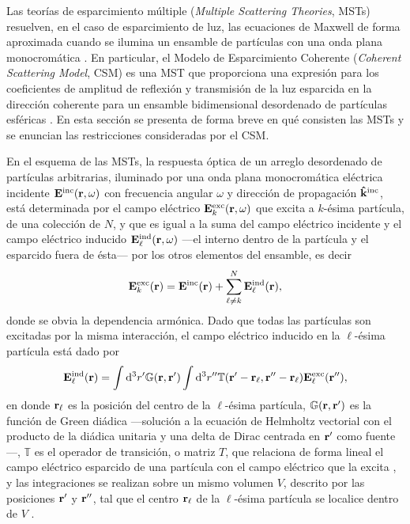 %
Las teorías de esparcimiento múltiple (\textit{Multiple Scattering Theories}, MSTs) resuelven, en el caso de esparcimiento de luz, las ecuaciones de Maxwell de forma aproximada cuando se ilumina un ensamble de partículas con una onda plana monocromática \cite{loiko_monolayers_1998,barrera1991optical,reyes2018analytical}. En particular, el  Modelo de Esparcimiento Coherente (\textit{Coherent Scattering Model}, CSM)  es una MST que proporciona una expresión para los coeficientes de amplitud de reflexión y transmisión de la luz esparcida en la dirección coherente para un ensamble bidimensional desordenado de partículas esféricas \cite{barrera_coherent_2003,garcia2012multiple,reyes2018analytical}. En esta sección se presenta de forma breve en qué consisten las MSTs y se enuncian las restricciones consideradas por el CSM.

En el esquema de las MSTs, la respuesta óptica de un arreglo desordenado de partículas arbitrarias, iluminado por una onda plana monocromática eléctrica incidente $\vb{E}^\text{inc}(\vb{r},\omega)$ con frecuencia angular $\omega$ y dirección de propagación $\vu{k}^\text{inc}$, está determinada por el campo eléctrico $\vb{E}^\text{exc}_k(\vb{r},\omega)$ que excita a $k$-ésima partícula, de una colección de $N$, y que es igual a la suma del campo eléctrico incidente y el campo eléctrico inducido $\vb{E}^\text{ind}_\ell(\vb{r},\omega)$ ---el interno dentro de la partícula y el esparcido fuera de ésta--- por los otros elementos del ensamble, es decir \cite{garcia2012multiple,barrera_coherent_2003}
%
\begin{align}
	\vb{E}^\text{exc}_k(\vb{r}) = \vb{E}^\text{inc}(\vb{r}) + \sum_{\ell\neq k}^N \vb{E}^\text{ind}_\ell(\vb{r}),
	\label{eq:Eexc}
\end{align}
%
donde se obvia la dependencia armónica. Dado que todas las partículas son excitadas por la misma interacción,  el campo eléctrico inducido en la $\ell$-ésima partícula está dado por \cite{garcia2012multiple,barrera_coherent_2003}
%
\begin{align}
	\vb{E}^\text{ind}_\ell(\vb{r}) =
	\int\dd^3 r' \mathbb{G}(\vb{r},\vb{r}')
	\int\dd^3 r''\mathbb{T}(\vb{r}'-\vb{r}_\ell,\vb{r}''-\vb{r}_\ell) \vb{E}_\ell^\text{exc}(\vb{r}''),
	\label{eq:Eind}
\end{align}
%
en donde $\vb{r}_\ell$ es la posición del centro de la $\ell$-ésima partícula, $\mathbb{G}(\vb{r},\vb{r}')$ es la función de Green diádica ---solución a la ecuación de Helmholtz vectorial con el producto de la diádica unitaria y una delta de Dirac centrada en $\vb{r}'$ como fuente \cite{tsang_scattering_2000}---, $\mathbb{T}$ es el operador de transición, o matriz $T$, que relaciona de forma lineal el campo eléctrico esparcido de una partícula con el campo eléctrico que la excita \cite{tsang_scattering_2000}, y las integraciones se realizan sobre un mismo volumen $V$, descrito por las posiciones $\vb{r}'$ y $\vb{r}''$, tal que el centro $\vb{r}_\ell$ de la $\ell$-ésima partícula se localice dentro de $V$ \cite{barrera_coherent_2003}.

